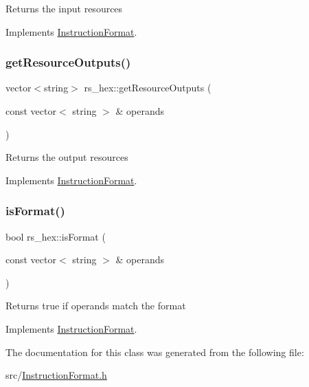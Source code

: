 Returns the input resources 

Implements \hyperlink{classInstructionFormat_a09775d3a3c22f40a0f44504664e586e4}{Instruction\+Format}.

\mbox{\label{classrs__hex_a7b4f63e180c5641a65037eff96b339f0}} 
\subsubsection{\texorpdfstring{get\+Resource\+Outputs()}{getResourceOutputs()}}
{\footnotesize\ttfamily vector$<$string$>$ rs\+\_\+hex\+::get\+Resource\+Outputs (\begin{DoxyParamCaption}\item[{const vector$<$ string $>$ \&}]{operands }\end{DoxyParamCaption})\hspace{0.3cm}{\ttfamily [virtual]}}

Returns the output resources 

Implements \hyperlink{classInstructionFormat_a95cd28ffb1bde59b67f676880ab10536}{Instruction\+Format}.

\mbox{\label{classrs__hex_abd5955b23a014a84f32125fb9d6a75c8}} 
\subsubsection{\texorpdfstring{is\+Format()}{isFormat()}}
{\footnotesize\ttfamily bool rs\+\_\+hex\+::is\+Format (\begin{DoxyParamCaption}\item[{const vector$<$ string $>$ \&}]{operands }\end{DoxyParamCaption})\hspace{0.3cm}{\ttfamily [virtual]}}

Returns true if operands match the format 

Implements \hyperlink{classInstructionFormat_a9fdcf94dcd7d9a55ba86e7a63f04d1fe}{Instruction\+Format}.



The documentation for this class was generated from the following file\+:\begin{DoxyCompactItemize}
\item 
src/\hyperlink{InstructionFormat_8h}{Instruction\+Format.\+h}\end{DoxyCompactItemize}
